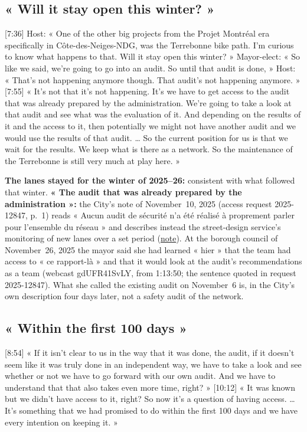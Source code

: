 \documentclass[11pt,letterpaper]{article}
\newcommand{\pagesurl}{https://openmobilitydata.github.io/Terrebonne-access-requests}
\newcommand{\cliptime}[1]{\textsf{\small[#1]}}
\begin{document}
\subsection{« Will it stay open this winter? »}

\cliptime{7:36} Host: « One of the other big projects from the Projet
Montréal era specifically in Côte-des-Neiges-NDG, was the Terrebonne bike
path. I'm curious to know what happens to that. Will it stay open this
winter? » Mayor-elect: « So like we said, we're going to go into an audit. So
until that audit is done, » Host: « That's not happening anymore though. That
audit's not happening anymore. » \cliptime{7:55} « It's not that it's not
happening. It's we have to get access to the audit that was already prepared
by the administration. We're going to take a look at that audit and see what
was the evaluation of it. And depending on the results of it and the access
to it, then potentially we might not have another audit and we would use the
results of that audit. … So the current position for us is that we wait for
the results. We keep what is there as a network. So the maintenance of the
Terrebonne is still very much at play here. »

\textbf{The lanes stayed for the winter of 2025--26:} consistent with what
followed that winter. \textbf{« The audit that was already prepared by the
administration »:} the City's note of November~10, 2025 (access request
2025-12847, p.~1) reads « Aucun audit de sécurité n'a été réalisé à
proprement parler pour l'ensemble du réseau » and describes instead the
street-design service's monitoring of new lanes over a set period
(\href{\pagesurl/2025-12847/raw/NoteDG_Reseau_cyclable_Audit_Securite.pdf}{note}).
At the borough council of November~26, 2025 the mayor said she had learned
« hier » that the team had access to « ce rapport-là » and that it would look
at the audit's recommendations as a team (webcast gdUFR41SvLY, from 1:13:50;
the sentence quoted in request 2025-12847). What she called the existing audit
on November~6 is, in the City's own description four days later, not a safety
audit of the network.

\subsection{« Within the first 100 days »}

\cliptime{8:54} « If it isn't clear to us in the way that it was done, the
audit, if it doesn't seem like it was truly done in an independent way, we
have to take a look and see whether or not we have to go forward with our own
audit. And we have to understand that that also takes even more time, right? »
\cliptime{10:12} « It was known but we didn't have access to it, right? So now
it's a question of having access. … It's something that we had promised to do
within the first 100 days and we have every intention on keeping it. »
\end{document}
